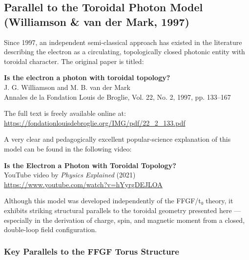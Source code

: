 \documentclass[12pt,a4paper]{article}
\begin{document}
\subsection{Parallel to the Toroidal Photon Model (Williamson \& van der Mark, 1997)}

Since 1997, an independent semi-classical approach has existed in the literature describing the electron as a circulating, topologically closed photonic entity with toroidal character. The original paper is titled:

\begin{center}
	\textbf{Is the electron a photon with toroidal topology?} \\
	J. G. Williamson and M. B. van der Mark \\
	Annales de la Fondation Louis de Broglie, Vol. 22, No. 2, 1997, pp. 133--167
\end{center}

The full text is freely available online at: \\
\url{https://fondationlouisdebroglie.org/IMG/pdf/22_2_133.pdf}

A very clear and pedagogically excellent popular-science explanation of this model can be found in the following video:

\begin{center}
	\textbf{Is the Electron a Photon with Toroidal Topology?} \\
	YouTube video by \emph{Physics Explained} (2021) \\
	\url{https://www.youtube.com/watch?v=hYyrgDEJLOA}
\end{center}

Although this model was developed independently of the FFGF/t₀ theory, it exhibits striking structural parallels to the toroidal geometry presented here — especially in the derivation of charge, spin, and magnetic moment from a closed, double-loop field configuration.

\subsubsection{Key Parallels to the FFGF Torus Structure}
\end{document}
